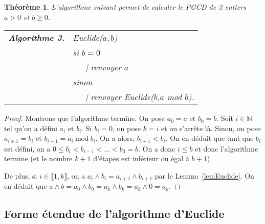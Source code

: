 \documentclass[10pt,a4paper]{report}
\newtheorem*{qst}{Question}
\newtheorem*{rep}{Réponse}
\newtheorem{thm}{Théorème}[chapter]
\newcommand{\N}{\mathbb{N}}
\begin{document}
\begin{thm}\label{thmAlgorithme_d_euclide}
L'algorithme suivant permet de calculer le PGCD de 2 entiers $a>0$ et $b \geqslant 0$.\\

\begin{tabular}{ll}
\textbf{Algorithme 3.} & Euclide($a,b$)\\
 & si $b=0$     \\
 & \ \ \ {\rm |} renvoyer $a$  \\
 & sinon   \\ 
 & \ \ \ {\rm |  } renvoyer Euclide($b$,$a$ mod $b$).
\end{tabular}
\end{thm}

\begin{proof}
Montrons que l'algorithme termine. On pose $a_0=a$ et $b_0=b$. Soit $i\in \N$ tel qu'on a défini $a_i$ et $b_i$. Si $b_i=0$, on pose $k=i$ et on s'arrête là. Sinon, on pose $a_{i+1}=b_i$ et $b_{i+1}=a_i\mathrm{\ mod\ }b_i$. On a alors, $b_{i+1}< b_i$. On en déduit que tant que $b_i$ est défini, on a $0\leq b_i<b_{i-1}<\ldots < b_0=b$. On a donc $i\leq b$ et donc l'algorithme termine (et le nombre $k+1$ d'étapes est inférieur ou égal à $b+1$). 

De plus, si $i\in \llbracket 1,k\rrbracket$, on a $a_i\wedge b_i=a_{i+1}\wedge b_{i+1}$ par le Lemma~\ref{lemEuclide}. On en déduit que $a\wedge b= a_0\wedge b_0=a_k\wedge b_k =a_k\wedge 0=a_k$.
\end{proof}



\subsection{Forme étendue de l'algorithme d'Euclide}

\end{document}
